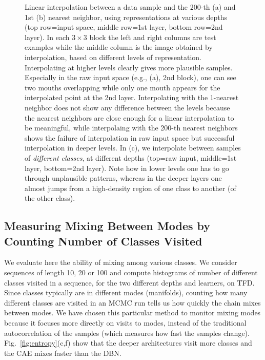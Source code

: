 \begin{figure}
\caption[Linear Imterpolations at various depths]{ Linear interpolation between a data sample and the 200-th (a)
and 1st (b) nearest neighbor, using representations 
at various depths (top row=input space, middle row=1st layer,
bottom row=2nd layer).  In each $3\times3$ block the left and right columns are
test examples while the middle column is the image obtained by interpolation, based on
different levels of representation.
Interpolating at higher levels clearly gives more plausible samples. Especially in
the raw input space (e.g., (a), 2nd block), one can see two mouths overlapping while only one mouth appears
for the interpolated point at the 2nd layer. Interpolating with the 1-nearest neighbor
does not show any difference between the levels because the nearest neighbors are close enough
for a linear interpolation to be meaningful, while interpolaing with the 200-th nearest
neighbors shows the failure of interpolation in raw input space but successful
interpolation in deeper levels. In (c), we interpolate between samples
of {\em different classes}, at different depths (top=raw input, middle=1st layer, bottom=2nd layer).
Note how in lower levels one has to go through unplausible patterns, whereas in the deeper
layers one almost jumps from a high-density region of one class to another (of the other class).}
\label{fig:interpol}
\end{figure}




\vspace*{-1mm}
\subsection{Measuring Mixing Between Modes by Counting Number of Classes Visited}
\label{sec:mix-time}
\vspace*{-1mm}

We evaluate here the ability of mixing among various classes. We consider sequences
of length 10, 20 or 100 and compute histograms of number of different classes visited
in a sequence, for the two different depths and learners, on TFD. Since classes
typically are in different modes (manifolds), counting how many different classes
are visited in an MCMC run tells us how quickly the chain mixes between modes.
We have chosen this particular method to monitor mixing modes because it focuses more
directly on visits to modes, instead of the traditional autocorrelation of the
samples (which measures how fast the samples change).
Fig.~\ref{fig:entropy}(c,f) show that the deeper architectures visit more classes
and the CAE mixes faster than the DBN. 

